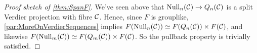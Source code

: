 \documentclass[a4paper, 10pt, oneside, DIV=9, chapterprefix=true, numbers=enddot,bibliography=totoc]{scrbook}
\begin{document}
\begin{proof}[Proof sketch of \cref{thm:SpanF}]
	We've seen above that $\operatorname{Null}_n(\Cc)\morphism Q_n(\Cc)$ is a split Verdier projection with fibre $\mathcal{C}$. Hence, since $F$ is grouplike, \cref{par:MoreOnVerdierSequences} implies $F(\operatorname{Null}_n(\mathcal{C}))\simeq F(Q_n(\mathcal{C}))\times F(\mathcal{C})$, and likewise $F(\operatorname{Null}_m(\mathcal{C}))\simeq F(Q_m(\mathcal{C}))\times F(\mathcal{C})$. So the pullback property is trivially satisfied.
\end{proof}



\backmatter{}
\printbibliography
\end{document}
